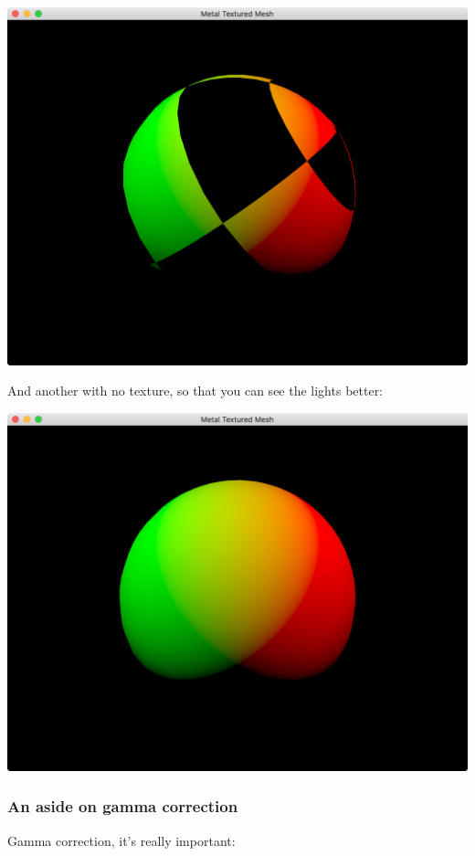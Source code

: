 \documentclass[11pt]{article}
\begin{document}
\begin{center}
\includegraphics[width=.9\linewidth]{../img/posts/implementing-deferred-shading-in-metal/lights-colour-albedo.png}
\end{center}

And another with no texture, so that you can see the lights better:

\begin{center}
\includegraphics[width=.9\linewidth]{../img/posts/implementing-deferred-shading-in-metal/lights-colour-flat.png}
\end{center}

\subsubsection*{An aside on gamma correction}
\label{sec:orgb82ea69}
Gamma correction, it's really important:
\end{document}
